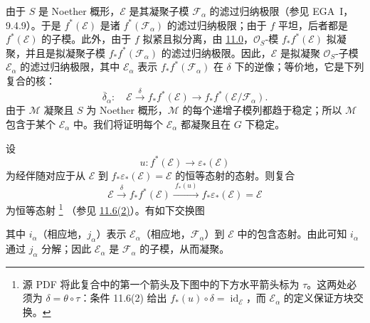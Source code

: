 由于 \(S\) 是 Noether 概形，\(\mathcal E\) 是其凝聚子模 \(\mathcal F_\alpha\) 的滤过归纳极限\textup{（参见 EGA~I，9.4.9）}。于是 \(f^*(\mathcal E)\) 是诸 \(f^*(\mathcal F_\alpha)\) 的滤过归纳极限；由于 \(f\) 平坦，后者都是 \(f^*(\mathcal E)\) 的子模。此外，由于 \(f\) 拟紧且拟分离，由 \hyperref[par:sga3-VIB-11.0]{11.0}，\(\mathcal O_S\)-模 \(f_*f^*(\mathcal E)\) 拟凝聚，并且是拟凝聚子模 \(f_*f^*(\mathcal F_\alpha)\) 的滤过归纳极限。因此，\(\mathcal E\) 是拟凝聚 \(\mathcal O_S\)-子模 \(\mathcal E_\alpha\) 的滤过归纳极限，其中 \(\mathcal E_\alpha\) 表示 \(f_*f^*(\mathcal F_\alpha)\) 在 \(\delta\) 下的逆像；等价地，它是下列复合的核：
\label{form:sga3-VIB-11.10bis-delta-alpha}%
\[
  \overline{\delta}_\alpha:\quad
  \mathcal E\xrightarrow{\ \delta\ }f_*f^*(\mathcal E)
    \longrightarrow f_*f^*(\mathcal E/\mathcal F_\alpha).
\]
由于 \(\mathcal M\) 凝聚且 \(S\) 为 Noether 概形，\(\mathcal M\) 的每个递增子模列都趋于稳定；所以 \(\mathcal M\) 包含于某个 \(\mathcal E_\alpha\) 中。我们将证明每个 \(\mathcal E_\alpha\) 都凝聚且在 \(G\) 下稳定。

设
\[
  u:f^*(\mathcal E)\longrightarrow\varepsilon_*(\mathcal E)
\]
为经伴随对应于从 \(\mathcal E\) 到 \(f_*\varepsilon_*(\mathcal E)=\mathcal E\) 的恒等态射的态射。则复合
\label{form:sga3-VIB-11.10bis-adjunction-retract}%
\[
  \mathcal E\xrightarrow{\ \delta\ }f_*f^*(\mathcal E)
    \xrightarrow{\ f_*(u)\ }f_*\varepsilon_*(\mathcal E)
    =\mathcal E
\]
为恒等态射%
\footnote{\label{source-note:sga3-VIB-11.10bis-delta-arrows}源 PDF 将此复合中的第一个箭头及下图中的下方水平箭头标为 \(\tau\)。这两处必须为 \(\delta=\theta\circ\tau\)：条件 11.6\textup{(2)} 给出 \(f_*(u)\circ\delta=\operatorname{id}_{\mathcal E}\)，而 \(\mathcal E_\alpha\) 的定义保证方块交换。}
\textup{（参见 \hyperref[diag:sga3-VIB-11.6-2]{11.6\textup{(2)}}）}。有如下交换图
\begin{center}
  \label{diag:sga3-VIB-11.10bis-coherence}%
\end{center}
其中 \(i_\alpha\)\textup{（相应地，\(j_\alpha\)）}表示 \(\mathcal E_\alpha\)\textup{（相应地，\(\mathcal F_\alpha\)）}到 \(\mathcal E\) 中的包含态射。由此可知 \(i_\alpha\) 通过 \(j_\alpha\) 分解；因此 \(\mathcal E_\alpha\) 是 \(\mathcal F_\alpha\) 的子模，从而凝聚。

